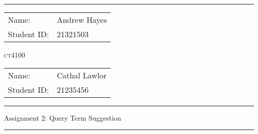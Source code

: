 \documentclass[a4paper]{article}
\begin{document}
\hrule \medskip
\begin{minipage}{0.295\textwidth} 
    \raggedright
    \footnotesize 
    \begin{tabular}{@{}l l} %
        Name: & Andrew Hayes \\
        Student ID: & 21321503 \\
    \end{tabular}
\end{minipage}
\begin{minipage}{0.4\textwidth} 
    \centering 
    \vspace{0.4em}
    \LARGE 
    \textsc{ct4100} \\ 
\end{minipage}
\begin{minipage}{0.295\textwidth} 
    \raggedleft
    \footnotesize 
    \begin{tabular}{@{}l l} %
        Name: & Cathal Lawlor \\
        Student ID: & 21235456 \\
    \end{tabular}
\end{minipage}
\smallskip
\hrule 
\begin{center}
    \normalsize
    Assignment 2: Query Term Suggestion
\end{center}
\hrule
\end{document}
